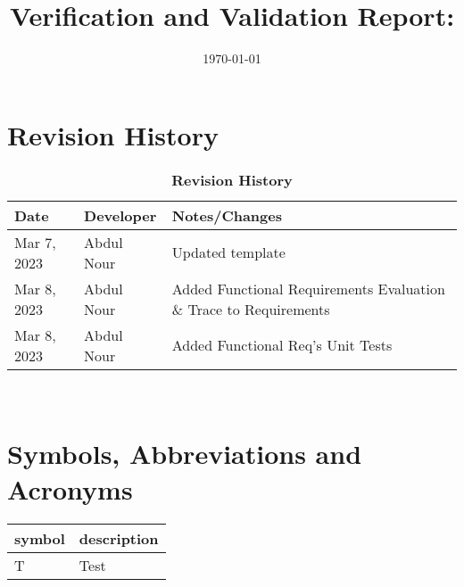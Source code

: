 \documentclass[12pt, titlepage]{article}
\begin{document}
\title{Verification and Validation Report: \progname} 
\author{\authname}
\date{\today}
	
\maketitle


\section{Revision History}

\begin{table}[H]
  \caption{\bf Revision History}
  \begin{tabularx}{\textwidth}{p{2.5cm}p{2.5cm}X}
  \toprule {\bf Date} & {\bf Developer} & {\bf Notes/Changes}\\
  \midrule
  Mar 7, 2023 & Abdul Nour & Updated template\\
  Mar 8, 2023 & Abdul Nour & Added Functional Requirements Evaluation \& Trace to Requirements\\
  Mar 8, 2023 & Abdul Nour & Added Functional Req's Unit Tests\\
  \bottomrule
  \end{tabularx}
  \end{table}

~\newpage

\section{Symbols, Abbreviations and Acronyms}

\renewcommand{\arraystretch}{1.2}
\begin{tabular}{l l} 
  \toprule		
  \textbf{symbol} & \textbf{description}\\
  \midrule 
  T & Test\\
  \bottomrule
\end{tabular}\\


\newpage

\tableofcontents

\listoftables %

\listoffigures %

\newpage

\end{document}
